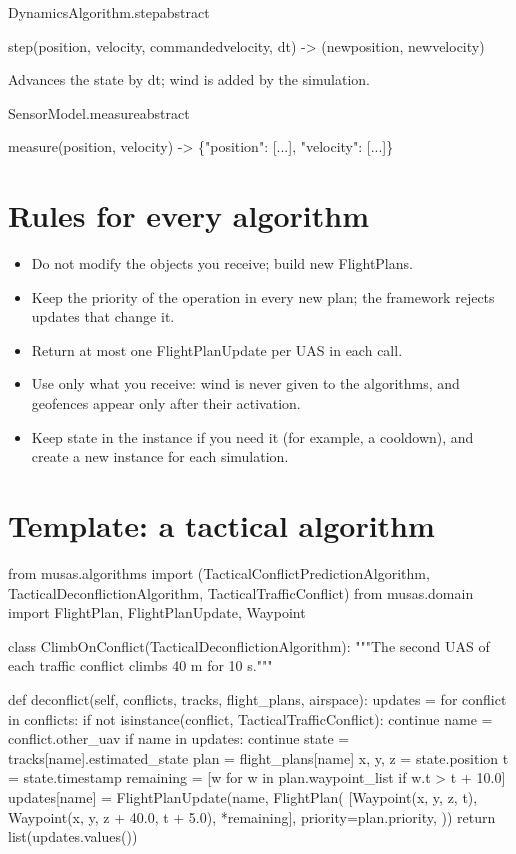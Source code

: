 \documentclass[11pt,a4paper,oneside]{report}
\newcommand{\sig}[1]{\par{\small\ttfamily\def\_{\textunderscore\allowbreak}\color{primary!85!black}#1}\par}
\newcommand{\code}[1]{\textcolor{primary!85!black}{\ttfamily\def\_{\textunderscore\allowbreak}#1}}
\begin{document}
\begin{api}{DynamicsAlgorithm.step}{abstract}
\sig{step(position, velocity, commanded\_velocity, dt) -> (new\_position,
new\_velocity)}
Advances the state by \code{dt}; wind is added by the simulation.
\end{api}

\begin{api}{SensorModel.measure}{abstract}
\sig{measure(position, velocity) -> \{"position": [...], "velocity":
[...]\}}
\end{api}

\section{Rules for every algorithm}

\begin{itemize}
  \item Do not modify the objects you receive; build new \code{FlightPlan}s.
  \item Keep the \code{priority} of the operation in every new plan; the
    framework rejects updates that change it.
  \item Return at most one \code{FlightPlanUpdate} per UAS in each call.
  \item Use only what you receive: wind is never given to the algorithms, and
    geofences appear only after their activation.
  \item Keep state in the instance if you need it (for example, a cooldown),
    and create a new instance for each simulation.
\end{itemize}

\section{Template: a tactical algorithm}

\begin{pycode}
from musas.algorithms import (TacticalConflictPredictionAlgorithm,
                              TacticalDeconflictionAlgorithm,
                              TacticalTrafficConflict)
from musas.domain import FlightPlan, FlightPlanUpdate, Waypoint


class ClimbOnConflict(TacticalDeconflictionAlgorithm):
    """The second UAS of each traffic conflict climbs 40 m for 10 s."""

    def deconflict(self, conflicts, tracks, flight_plans, airspace):
        updates = {}
        for conflict in conflicts:
            if not isinstance(conflict, TacticalTrafficConflict):
                continue
            name = conflict.other_uav
            if name in updates:
                continue
            state = tracks[name].estimated_state
            plan = flight_plans[name]
            x, y, z = state.position
            t = state.timestamp
            remaining = [w for w in plan.waypoint_list if w.t > t + 10.0]
            updates[name] = FlightPlanUpdate(name, FlightPlan(
                [Waypoint(x, y, z, t), Waypoint(x, y, z + 40.0, t + 5.0),
                 *remaining],
                priority=plan.priority,
            ))
        return list(updates.values())
\end{pycode}
\end{document}
